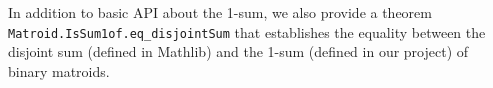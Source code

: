 In addition to basic API about the 1-sum, we also provide
a theorem \texttt{Matroid.IsSum1of.eq\_disjointSum} that establishes
the equality between the disjoint sum (defined in Mathlib) and
the 1-sum (defined in our project) of binary matroids.

\begin{comment}
    Ivan's suggestions:
    \begin{itemize}
        \item introduction can be shortened without losing clarity, e.g., "we implement the sums of matroids in three steps"
        \item discuss design decisions: why did we implement things this way? talk about our motivation
        \item focus on results rather than process, e.g., "Proving this lemma was surprisingly difficult" $\to$ "The proof of this lemma is surprisingly long" (+ why surprisingly? what is making it long?), "could have been avoided" $\to$ "this follows from a similar result for 2-sums" (what is the message of this paragraph? should it be included?)
        \item mention why result for 1-sums was kept even though it follows from similar result for 2-sums
    \end{itemize}
\end{comment}
